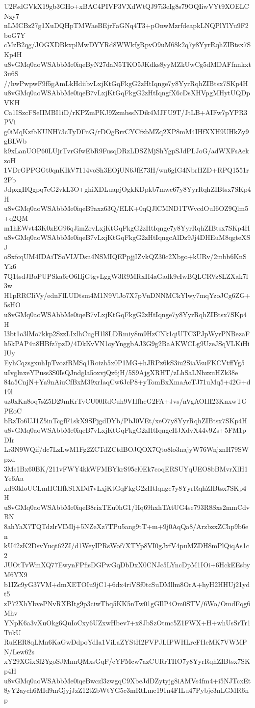 U2FsdGVkX19gb3GHo+xBAC4PIVP3VXdWtQJ97i3eIg8s79OQIiwVYt9XOELCNzy7
nLMCBz27g1XuDQHpTMWaeBEjrFaGNq4T3+pOnwMzrfdeapkLNQPlYlYu9F2boG7Y
cMzB2qg/JOGXDBkxplMwDYYRd8WWkfgRpvO9uM68k2q7y8YyrRqhZIBtsx7SKp4H
u8vGMq0aoWSAbbMe0iqeByN27daN5TKO5JKdks8yyMZkUwCg5dMDAFfnnkxt3u6S
//hwPwpwF9f5gAmLkHdiibvLxjKtGqFkgG2zHtIqnge7y8YyrRqhZIBtsx7SKp4H
u8vGMq0aoWSAbbMe0iqeB7vLxjKtGqFkgG2zHtIqngfX6cDsXHVpgMHytUQDpVKH
Ca1ISzcFSeIIMBI1iD/rKPZmPKJ9ZzmbssNDik4MJFU9T/JtLB+AIFw7pYPR3PVi
g0iMqKzfbKUNH73cTyDFnG/rDOgBrrCYCfzbMZq2XP8mM4IHfXXH9UHkZy9gBLWb
k9xLanUOP60LUjrTvrGfwEbR9FusqDRzLDSZMjShYgpSJdPLJoG/adWXFsAekzoH
1VDrGPPGGt0qnKIkV7114voSh3EOjUN6JfE73H/wn6gIG4NbrHZD+RPQ1551r2Pb
JdpxgHQgpq7eG2vkL3O+ghiXDLuapjOgkKDpkb7mwc67y8YyrRqhZIBtsx7SKp4H
u8vGMq0aoWSAbbMe0iqeB9axz63Q/ELK+0qQJlCMND1TWvcdOuI6OZ9Qlm5+q2QM
m1hEWvt43K0zEG96qJimZrvLxjKtGqFkgG2zHtIqnge7y8YyrRqhZIBtsx7SKp4H
u8vGMq0aoWSAbbMe0iqeB7vLxjKtGqFkgG2zHtIqngcAlDz9Jj4DHEuM8qgteXSJ
oSxfcqUM4IDAiTSoVLVDsn4NSMIQEPpjjIZvkQZ30c2Xbgo+kURv/2mbb6KnSYk6
7Q1tsdJBoPUPSka6rO6HjGtgvLggW3R9MRxII4aGadk9cIwBQLCRVz8LZXak7l3w
H1pRRCIiVy/ednFlLUDtsm4M1N9VlJo7X7pVuDNNMCkYlwy7mqYzoJCg6ZG+5sHO
u8vGMq0aoWSAbbMe0iqeB7vLxjKtGqFkgG2zHtIqnge7y8YyrRqhZIBtsx7SKp4H
I3bt1o3lMo7kkp2SzzLIxlhCugH1l8LDRmiy8m9HzCNk1qiUTC3PJpWyrPNBezaF
h5kPAP4n8HBfz7pzD/4DkKvVN1oyYnggbAJ3G9g2BaAKWCLg9UzeJSqVLKiHiIUy
EyhCqzsgxuhIpTvozfRMSq1Roizh5x0P1MG+hJRPz6kS3iu2SiaVsuFKCVtffYg5
uIvglnxeYPuss3S0IsQJndgla5oxvjQz6jH/5S9AjgXRHT/zLhSaLNhzzuHZk38e
84a5CnjN+Ya9nAiuCfBxM39xrIaqCw6JcP8+yTomBxXmaAcTJ71uMq5+42G+d19l
uz0xKn8oq7sZ5D29mKrTvCU00RdCuh9VHfheG2FA+Jvs/nVgAOHI23KnxwTGPEoC
bRzTo6UJ1Z5inTcgfF1skX9SPjgdDYb/PbJ0VEt/xeO7y8YyrRqhZIBtsx7SKp4H
u8vGMq0aoWSAbbMe0iqeB7vLxjKtGqFkgG2zHtIqngcHJXdvX44v9Zs+5FM1pDIr
Lr3N9WQif/dc7LzLwM1Fg2ZCTdZCtdBOJQOX7Qto8lo3najyW76WnjznH79SWpxd
3Ms1Bx60BK/211vFWY4kkWFMBYkrS95cl0Ek7coqERSUYqUEO8bBMvrXlH1Ye6Aa
xd93kloUCLmHCHfkS1XDd7vLxjKtGqFkgG2zHtIqnge7y8YyrRqhZIBtsx7SKp4H
u8vGMq0aoWSAbbMe0iqeB8rixTEu0hG1/Hq69hxhTAtUG4se793R8Sxs2mmCdvBN
8ahYaX7TQTdzlrVIMlj+5NZeXz7TPu5ang9tT+m+9j0AqQa8/ArzbzxZChp9b6en
kU42zK2DsvYuqt62ZI/d1WeyIPRsWof7XTYp8VI0gJxfV4puMZDH8mPlQiqAs1c2
JUOtTvWmXQ77EwynFPfisDGPwGqDbDxX0CNJc5LYncDpM1IOi+6HckEEsbyM6YX9
b1IZc9yG37VM+dmXETOIu9jC1+6dx4riVSf0tcSuDMllm8OrA+hyH2HHUj21ydt5
zP72XhYbvePNvRXBItg9p3ciwTbq5KK5nTw01gGIlP4Om0STV/6Wo/OmdFqg6Mhv
YNpK6a3vXuOkg6QuIoCxy6UZxwHbev7+x8JbSzOtmc5Z1FWX+H+whUsSrTr1TukU
RuEER8qLMn6KaGwDdpoYdIa1ViLaZYStH2FVPJLIPWHLrcFHeMK7VWMPN/Lew62s
xY29XGixSl2YgoSJMnnQMxsGqF/cYFMcw7azCURrTHO7y8YyrRqhZIBtsx7SKp4H
u8vGMq0aoWSAbbMe0iqeBwczl3zwgqC9XbeJdDZytyjg8iAMVs4fm4+i5NJTcxEt
8yY2aych6MId9mGjyjJzZ12tZbWtYG5c3mRtLme191n4FILu47Pybje3nLGMR6np
